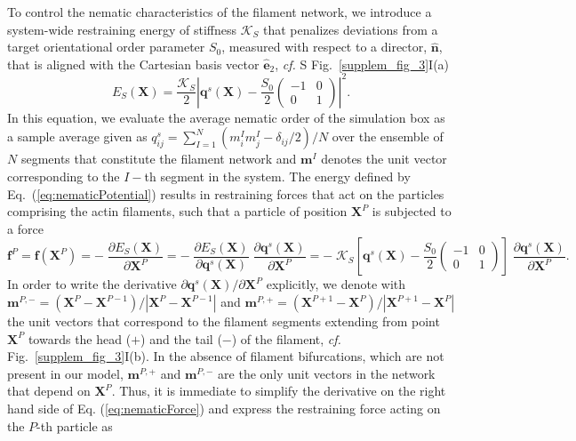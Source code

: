 To control the nematic characteristics of the filament network, we introduce a system-wide restraining energy of stiffness $\mathcal{K}_S$ that penalizes deviations from a target orientational order parameter $S_0$, measured with respect to a director, $\bm{\hat{n}}$, that is aligned with the Cartesian basis vector $\hat{\bm{e}}_2$, \textit{cf.} S Fig.~\ref{supplem_fig_3}I(a)
\begin{equation}\label{eq:nematicPotential}
	E_S(\bm{X}) = \frac{\mathcal{K}_S}{2} \left\vert \bm{q}^s(\bm{X}) - \frac{S_0}{2} \left(\begin{array}{rr}-1 & 0  \\0 & 1\end{array}\right) \right\vert^2 .
\end{equation}
In this equation, we evaluate the average nematic order of the simulation box as a sample average given as
${q}^s_{ij} = \sum_{I=1}^N \left( {m}^I_i {m}^I_j - \delta_{ij} / 2\right) / N$  over the ensemble of $N$ segments that constitute the filament network and $\bm{m}^I$ denotes the unit vector corresponding to the $I-$th segment in the system. The energy defined by Eq.~(\ref{eq:nematicPotential}) results in restraining forces that act on the particles comprising the actin filaments, such that a particle of position $\bm{X}^P$ is subjected to a force
\begin{equation}\label{eq:nematicForce}
	\bm{f}^P = \bm{f}\left(\bm{X}^P\right) = - \; \frac{\partial E_S (\bm{X})}{\partial \bm{X}^P} = - \; \frac{\partial E_S(\bm{X})}{\partial \bm{q}^s(\bm{X})} \; \frac{ \partial \bm{q}^s(\bm{X})}{\partial \bm{X}^P} = - \; \mathcal{K}_S \left[ \bm{q}^s(\bm{X}) - \frac{S_0}{2} \left(\begin{array}{rr}-1 & 0  \\0 & 1\end{array}\right) \right] \; \frac{ \partial \bm{q}^s(\bm{X})}{\partial \bm{X}^P}.
\end{equation}
In order to write the derivative $\partial \bm{q}^s(\bm{X}) /\partial \bm{X}^P$ explicitly, we denote with 
\newline
$\bm{m}^{P,-} = \left(\bm{X}^{P} - \bm{X}^{P-1} \right) / \left| \bm{X}^{P} - \bm{X}^{P-1} \right|$ and $\bm{m}^{P,+} = \left(\bm{X}^{P+1} - \bm{X}^{P} \right) / \left| \bm{X}^{P+1} - \bm{X}^{P} \right|$ the unit vectors that correspond to the filament segments extending from point $\bm{X}^P$ towards the head ($+$) and the tail ($-$) of the filament,  \textit{cf.} Fig.~\ref{supplem_fig_3}I(b). In the absence of filament bifurcations, which are not present in our model, $\bm{m}^{P,+}$ and $\bm{m}^{P,-}$ are the only unit vectors in the network that depend on $\bm{X}^P$. Thus, it is immediate to simplify the derivative on the right hand side of Eq. (\ref{eq:nematicForce}) and express the restraining force acting on the $P$-th particle as

